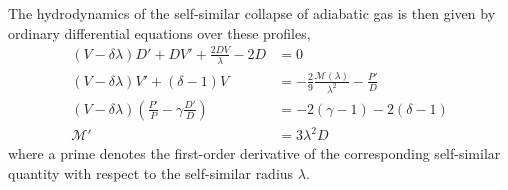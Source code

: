 The hydrodynamics of the self-similar collapse of adiabatic gas is then given by ordinary differential equations over these  profiles,
\begin{align}
\label{eq:selfsim-sph_hydro_cont}
(V-\delta \lambda) D' + DV' + \frac{2 D V}{\lambda} - 2D &= 0\\
\label{eq:selfsim-sph_hydro_accl}
(V-\delta \lambda) V' + (\delta -1 ) V &= - \frac{2}{9} \frac{\mathcal{M}(\lambda)}{\lambda^2 } - \frac{P'}{D}\\
\label{eq:selfsim-sph_hydro_adiab}
(V-\delta \lambda) \left( \frac{P'}{P} - \gamma \frac{D'}{D} \right) &= -2 (\gamma - 1) - 2 (\delta -1)\\
\label{eq:selfsim-sph_hydro_mass_cons}
\mathcal{M}' &= 3 \lambda^2 D
\end{align}
where a prime denotes the first-order derivative of the corresponding self-similar quantity with respect to the self-similar radius $\lambda$.

